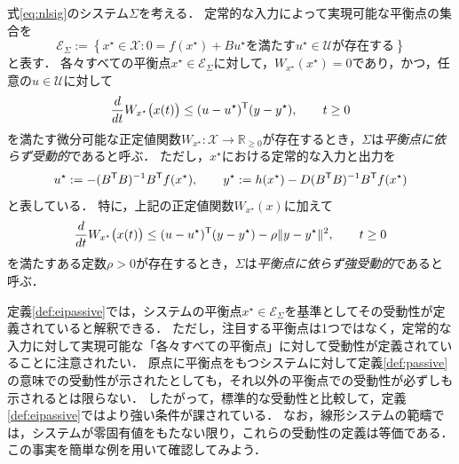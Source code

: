 \documentclass[a4j,10pt,oneside,openany,dvipdfmx]{jsbook}
\begin{document}
\begin{definition}\label{def:eipassive}
式\eqref{eq:nlsig}のシステム$\Sigma$を考える．
定常的な入力によって実現可能な平衡点の集合を
\begin{equation}\label{eq:asbleq}
\mathcal{E}_{\Sigma} :=
\left\{
x^{\star} \in \mathcal{X}: 
\mbox{$0 = f(x^{\star})+B u^{\star}$を満たす$u^{\star}\in \mathcal{U}$が存在する}
\right\}
\end{equation}
と表す．
各々すべての平衡点$x^{\star} \in \mathcal{E}_{\Sigma}$に対して，$W_{x^{\star}} (x^{\star})=0$であり，かつ，任意の$u \in \mathcal{U}$に対して
\begin{equation}\label{eq:eiconpv}
\frac{d}{dt} W_{x^{\star}} \bigl( x(t) \bigr) \leq (u-u^{\star})^{\sf T} (y-y^{\star})
,\qquad
t \geq 0
\end{equation}
を満たす微分可能な正定値関数$W_{x^{\star}}:\mathcal{X} \rightarrow \mathbb{R}_{\geq 0}$が存在するとき，$\Sigma$は\emph{平衡点に依らず受動的}であると呼ぶ．
ただし，$x^{\star}$における定常的な入力と出力を
\begin{equation}\label{eq:uystar}
u^{\star} := -(B^{\sf T}B)^{-1}B^{\sf T}f(x^{\star}) 
,\qquad
y^{\star} := h(x^{\star}) - D (B^{\sf T}B)^{-1}B^{\sf T}f(x^{\star})
\end{equation}
と表している．
特に，上記の正定値関数$W_{x^{\star}}(x)$に加えて
\begin{equation}\label{eq:eiconosp}
\frac{d}{dt} W_{x^{\star}} \bigl( x(t) \bigr) \leq (u-u^{\star})^{\sf T} (y-y^{\star})
-\rho\|y-y^{\star}\|^2
,\qquad
t \geq 0
\end{equation}
を満たすある定数$\rho >0$が存在するとき，$\Sigma$は\emph{平衡点に依らず強受動的}であると呼ぶ．
\end{definition}

定義\ref{def:eipassive}では，システムの平衡点$x^{\star} \in \mathcal{E}_{\Sigma}$を基準としてその受動性が定義されていると解釈できる．
ただし，注目する平衡点は1つではなく，定常的な入力に対して実現可能な「各々すべての平衡点」に対して受動性が定義されていることに注意されたい．
原点に平衡点をもつシステムに対して定義\ref{def:passive}の意味での受動性が示されたとしても，それ以外の平衡点での受動性が必ずしも示されるとは限らない．
したがって，標準的な受動性と比較して，定義\ref{def:eipassive}ではより強い条件が課されている．
なお，線形システムの範疇では，システムが零固有値をもたない限り，これらの受動性の定義は等価である\cite{hines2011equilibrium}．
この事実を簡単な例を用いて確認してみよう．
\end{document}
